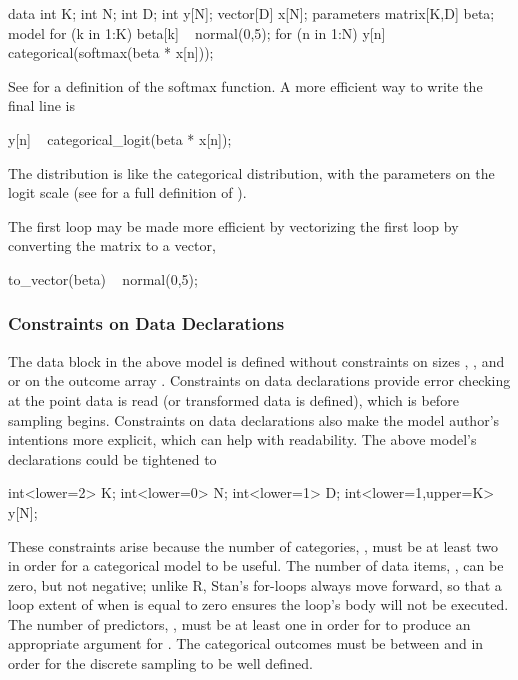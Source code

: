 \begin{stancode}
data {
  int K;
  int N;
  int D;
  int y[N];
  vector[D] x[N];
}
parameters {
  matrix[K,D] beta;
}
model {
  for (k in 1:K)
    beta[k] ~ normal(0,5);
  for (n in 1:N)
    y[n] ~ categorical(softmax(beta * x[n]));
}
\end{stancode}
%
See  for a definition of the softmax
function.   A more efficient way to write the final line is
%
\begin{stancode}
    y[n] ~ categorical_logit(beta * x[n]);
\end{stancode}
%
The  distribution is like the categorical
distribution, with the parameters on the logit scale (see
 for a full definition of
).

The first loop may be made more efficient by vectorizing the first
loop by converting the matrix  to a vector, 
%
\begin{stancode}
to_vector(beta) ~ normal(0,5);
\end{stancode}


\subsubsection{Constraints on Data Declarations}

The data block in the above model is defined without constraints on
sizes , , and  or on the outcome array
.  Constraints on data declarations provide error checking at
the point data is read (or transformed data is defined), which is
before sampling begins.  Constraints on data declarations also make
the model author's intentions more explicit, which can help with
readability.  The above model's declarations could be tightened to
%

\begin{stancode}
  int<lower=2> K;
  int<lower=0> N;
  int<lower=1> D;
  int<lower=1,upper=K> y[N];
\end{stancode}
%
These constraints arise because the number of categories, ,
must be at least two in order for a categorical model to be useful.
The number of data items, , can be zero, but not negative;
unlike R, Stan's for-loops always move forward, so that a loop extent
of  when  is equal to zero ensures the loop's body
will not be executed.  The number of predictors, , must be at
least one in order for  to produce an
appropriate argument for .  The categorical outcomes
 must be between  and  in order for the
discrete sampling to be well defined.

